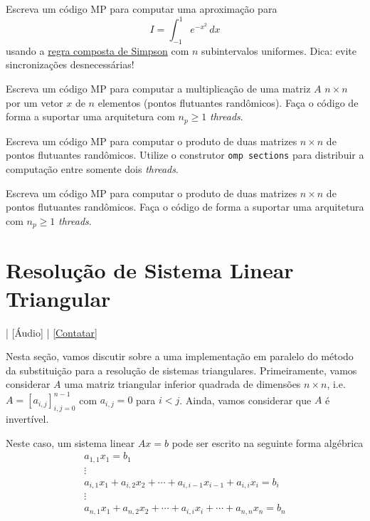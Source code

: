\begin{exer}\label{exer:cc_simp}
  Escreva um código MP para computar uma aproximação para
  \begin{equation}
    I = \int_{-1}^{1} e^{-x^2}\,dx
  \end{equation}
  usando a \href{https://phkonzen.github.io/notas/MatematicaNumerica/cap_integr_sec_int_comp.html}{regra composta de Simpson} com $n$ subintervalos uniformes. Dica: evite sincronizações desnecessárias!
\end{exer}

\begin{exer}\label{exer:cc_Ax}
  Escreva um código MP para computar a multiplicação de uma matriz $A$ $n\times n$ por um vetor $x$ de $n$ elementos (pontos flutuantes randômicos). Faça o código de forma a suportar uma arquitetura com $n_p \geq 1$ {\it threads}. 
\end{exer}

\begin{exer}
  Escreva um código MP para computar o produto de duas matrizes $n\times n$ de pontos flutuantes randômicos. Utilize o construtor \verb+omp sections+ para distribuir a computação entre somente dois {\it threads}. 
\end{exer}

\begin{exer}
  Escreva um código MP para computar o produto de duas matrizes $n\times n$ de pontos flutuantes randômicos. Faça o código de forma a suportar uma arquitetura com $n_p \geq 1$ {\it threads}.
\end{exer}

\section{Resolução de Sistema Linear Triangular}\label{cap_mp_sec_sistria}

\begin{flushright}
  [Vídeo] | [Áudio] | \href{https://phkonzen.github.io/notas/contato.html}{[Contatar]}
\end{flushright}

Nesta seção, vamos discutir sobre a uma implementação em paralelo do método da substituição para a resolução de sistemas triangulares. Primeiramente, vamos considerar $A$ uma matriz triangular inferior quadrada de dimensões $n\times n$, i.e. $A=[a_{i,j}]_{i,j=0}^{n-1}$ com $a_{i,j}=0$ para $i<j$. Ainda, vamos considerar que $A$ é invertível.

Neste caso, um sistema linear $Ax = b$ pode ser escrito na seguinte forma algébrica
\begin{gather}
  a_{1,1}x_1 = b_1\\
             \vdots \\
  a_{i,1}x_1 + a_{i,2}x_2 + \cdots + a_{i,i-1}x_{i-1} + a_{i,i}x_{i} = b_i \\
             \vdots\\
  a_{n,1}x_1 + a_{n,2}x_2 + \cdots + a_{i,i}x_i + \cdots + a_{n,n}x_{n} = b_n               
\end{gather}

